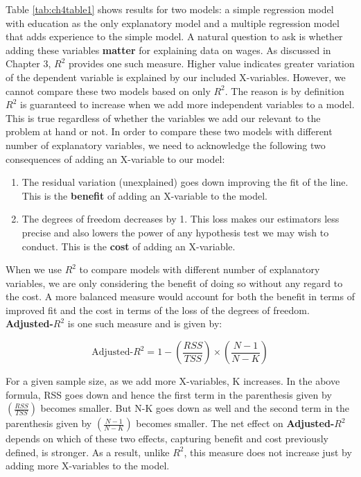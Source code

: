 \documentclass[
]{book}
\theoremstyle{definition}
\theoremstyle{definition}
\theoremstyle{definition}
\theoremstyle{definition}
\theoremstyle{remark}
\begin{document}
Table \ref{tab:ch4table1} shows results for two models: a simple regression model with education as the only explanatory model and a multiple regression model that adds experience to the simple model. A natural question to ask is whether adding these variables \textbf{matter} for explaining data on wages. As discussed in Chapter 3, \(R^2\) provides one such measure. Higher value indicates greater variation of the dependent variable is explained by our included X-variables. However, we cannot compare these two models based on only \(R^2\). The reason is by definition \(R^2\) is guaranteed to increase when we add more independent variables to a model. This is true regardless of whether the variables we add our relevant to the problem at hand or not. In order to compare these two models with different number of explanatory variables, we need to acknowledge the following two consequences of adding an X-variable to our model:

\begin{enumerate}
\def\labelenumi{\roman{enumi}.}
\item
  The residual variation (unexplained) goes down improving the fit of the line. This is the \textbf{benefit} of adding an X-variable to the model.
\item
  The degrees of freedom decreases by 1. This loss makes our estimators less precise and also lowers the power of any hypothesis test we may wish to conduct. This is the \textbf{cost} of adding an X-variable.
\end{enumerate}

When we use \(R^2\) to compare models with different number of explanatory variables, we are only considering the benefit of doing so without any regard to the cost. A more balanced measure would account for both the benefit in terms of improved fit and the cost in terms of the loss of the degrees of freedom. \textbf{Adjusted-\(R^2\)} is one such measure and is given by:

\[\text{Adjusted-}R^2= 1-\left(\frac{RSS}{TSS}\right)\times \left(\frac{N-1}{N-K}\right)\]

For a given sample size, as we add more X-variables, K increases. In the above formula, RSS goes down and hence the first term in the parenthesis given by \(\left(\frac{RSS}{TSS}\right)\) becomes smaller. But N-K goes down as well and the second term in the parenthesis given by \(\left(\frac{N-1}{N-K}\right)\) becomes smaller. The net effect on \textbf{Adjusted-\(R^2\)} depends on which of these two effects, capturing benefit and cost previously defined, is stronger. As a result, unlike \(R^2\), this measure does not increase just by adding more X-variables to the model.
\end{document}
